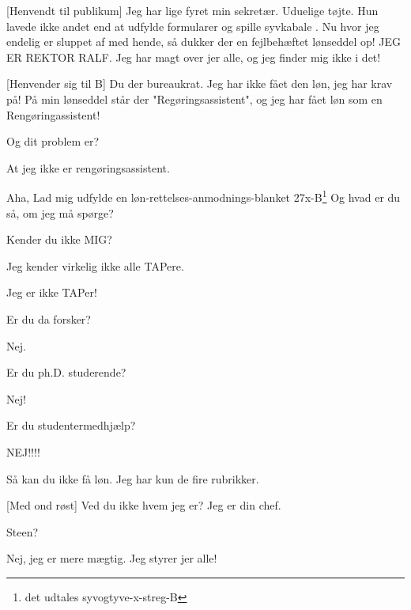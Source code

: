 \documentclass[a4paper,11pt]{article}
\begin{document}
  
\begin{sketch}


 
[Henvendt til publikum] Jeg har lige fyret min sekretær. Uduelige tøjte. 
Hun lavede ikke andet end at udfylde formularer og spille syvkabale . 
Nu hvor jeg endelig er sluppet af med hende, så dukker der en fejlbehæftet lønseddel 
op! JEG ER REKTOR RALF. Jeg har magt over jer alle, og jeg 
finder mig ikke i det!

[Henvender sig til B] Du der bureaukrat. Jeg 
har ikke fået den løn, jeg har krav på! På min lønseddel står der 
"Regøringsassistent", og jeg har fået løn som en Rengøringassistent!

  Og dit problem er?

 At jeg ikke er rengøringsassistent.

 Aha, Lad mig udfylde en løn-rettelses-anmodnings-blanket 27x-B\footnote{det udtales syvogtyve-x-streg-B}  Og hvad er du så, 
om jeg må spørge?

 Kender du ikke MIG?

 Jeg kender virkelig ikke alle TAPere.

 Jeg er ikke TAPer!

 Er du da forsker?

 Nej.

 Er du ph.D. studerende?

 Nej!

 Er du studentermedhjælp?

 NEJ!!!!

 Så kan du ikke få løn. Jeg har kun de fire rubrikker.

[Med ond røst] Ved du ikke hvem jeg er? Jeg er din chef.

 Steen?

 Nej, jeg er mere mægtig. Jeg styrer jer alle!


\end{sketch}
\end{document}
